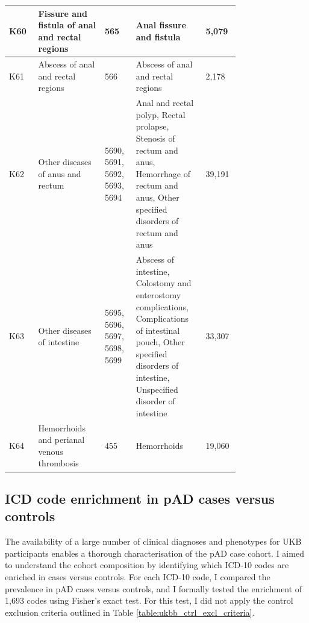 \begin{table}[H]
\begin{tabular}{|p{0.1\linewidth}|p{0.25\linewidth}|p{0.1\linewidth}|p{0.25\linewidth}|p{0.06\linewidth}|}
  K60         & Fissure and fistula of anal and rectal regions            & 565                                 & Anal fissure and fistula     & 5,079                                                                                                                                               \\ \hline
  K61         & Abscess of anal and rectal regions                        & 566                                 & Abscess of anal and rectal regions              &     2,178                                                                                                                        \\ \hline
  K62         & Other diseases of anus and rectum                         & 5690, 5691, 5692, 5693, 5694            & Anal and rectal polyp, Rectal prolapse, Stenosis of rectum and anus, Hemorrhage of rectum and anus, Other specified disorders of rectum and anus            & 39,191                \\ \hline
  K63         & Other diseases of intestine                               & 5695, 5696, 5697, 5698, 5699            & Abscess of intestine, Colostomy and enterostomy complications, Complications of intestinal pouch, Other specified disorders of intestine, Unspecified disorder of intestine & 33,307 \\ \hline
  K64         & Hemorrhoids and perianal venous thrombosis                & 455                                 & Hemorrhoids & 19,060\\ \hline

  \end{tabular}
  \end{table}
\subsection{ICD code enrichment in pAD cases versus controls}
The availability of a large number of clinical diagnoses and phenotypes for UKB participants enables a thorough characterisation of the pAD case cohort. I aimed to understand the cohort composition by identifying which ICD-10 codes are enriched in cases versus controls. For each ICD-10 code, I compared the prevalence in pAD cases versus controls, and I formally tested the enrichment of 1,693 codes using Fisher's exact test. For this test, I did not apply the control exclusion criteria outlined in Table \ref{table:ukbb_ctrl_excl_criteria}.
